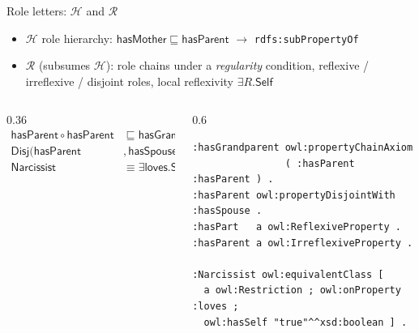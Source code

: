 \documentclass[10pt,aspectratio=169,xcolor=table]{beamer}
\newcommand{\dl}[1]{\ensuremath{\mathcal{#1}}}
\newcommand{\cn}[1]{\mathsf{#1}}
\newcommand{\rn}[1]{\mathsf{#1}}
\newcommand{\sub}{\sqsubseteq}
\newcommand{\eqv}{\equiv}
\begin{document}
\begin{frame}[fragile]{Role letters: \dl{H} and \dl{R}}
  \small
  \begin{itemize}
    \item \textbf{\dl{H}} role hierarchy: $\rn{hasMother} \sub \rn{hasParent}$
      \;$\to$\; \texttt{rdfs:subPropertyOf}
    \item \textbf{\dl{R}} (subsumes \dl{H}): role chains under a \emph{regularity} condition,
      reflexive / irreflexive / disjoint roles, local reflexivity $\exists R.\mathsf{Self}$
  \end{itemize}
  \begin{columns}[c]
    \begin{column}{0.36\textwidth}
      \footnotesize
      \begin{align*}
        \rn{hasParent} \circ \rn{hasParent} &\sub \rn{hasGrandparent}\\
        \mathsf{Disj}(\rn{hasParent}&, \rn{hasSpouse})\\
        \cn{Narcissist} &\eqv \exists \rn{loves}.\mathsf{Self}
      \end{align*}
    \end{column}
    \begin{column}{0.6\textwidth}
\begin{lstlisting}
:hasGrandparent owl:propertyChainAxiom
                ( :hasParent :hasParent ) .
:hasParent owl:propertyDisjointWith :hasSpouse .
:hasPart   a owl:ReflexiveProperty .
:hasParent a owl:IrreflexiveProperty .

:Narcissist owl:equivalentClass [
  a owl:Restriction ; owl:onProperty :loves ;
  owl:hasSelf "true"^^xsd:boolean ] .
\end{lstlisting}
    \end{column}
  \end{columns}
\end{frame}
\end{document}
